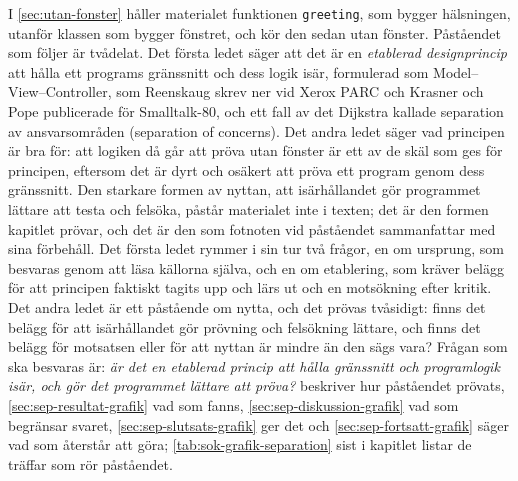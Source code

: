 I \cref{sec:utan-fonster} håller materialet funktionen
\texttt{greeting}, som bygger hälsningen, utanför klassen
som bygger fönstret, och kör den sedan utan fönster.  Påståendet som
följer är tvådelat.  Det första ledet säger att det är en
\emph{etablerad designprincip} att hålla ett programs gränssnitt och dess
logik isär, formulerad som Model--View--Controller, som Reenskaug
skrev ner vid Xerox PARC\autocite{Reenskaug1979MVC} och Krasner och
Pope publicerade för Smalltalk-80\autocite{KrasnerPope1988}, och ett fall
av det Dijkstra kallade separation av ansvarsområden
(\foreignlanguage{english}{separation of concerns})\autocite{%
Dijkstra1982Role}.  Det andra ledet säger vad principen är bra för: att
logiken då går att pröva utan fönster är ett av de skäl som ges för
principen, eftersom det är dyrt och osäkert att pröva ett program genom
dess gränssnitt.  Den starkare formen av nyttan, att isärhållandet gör
programmet lättare att testa och felsöka, påstår materialet inte i
texten; det är den formen kapitlet prövar, och det är den som fotnoten
vid påståendet sammanfattar med sina förbehåll.  Det första ledet rymmer
i sin tur två frågor, en om ursprung, som besvaras genom att läsa
källorna själva, och en om etablering, som kräver belägg för att
principen faktiskt tagits upp och lärs ut och en motsökning efter
kritik.  Det andra ledet är ett påstående om nytta, och det prövas
tvåsidigt: finns det belägg för att isärhållandet gör prövning och
felsökning lättare, och finns det belägg för motsatsen eller för att
nyttan är mindre än den sägs vara?  Frågan som ska besvaras är:
\emph{är det en etablerad princip att hålla gränssnitt och programlogik
isär, och gör det programmet lättare att pröva?}
 beskriver hur påståendet prövats,
\cref{sec:sep-resultat-grafik} vad som fanns,
\cref{sec:sep-diskussion-grafik} vad som begränsar svaret,
\cref{sec:sep-slutsats-grafik} ger det och
\cref{sec:sep-fortsatt-grafik} säger vad som återstår att göra;
\cref{tab:sok-grafik-separation} sist i kapitlet listar de träffar som
rör påståendet.

